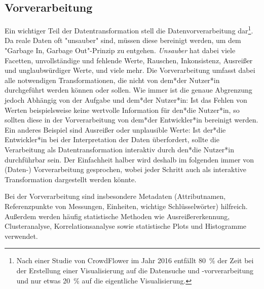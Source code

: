 	\subsection{Vorverarbeitung}
		Ein wichtiger Teil der Datentransformation stell die Datenvorverarbeitung dar\footnote{Nach einer Studie von CrowdFlower im Jahr 2016 entfällt \SI{80}{\percent} der Zeit bei der Erstellung einer Visualisierung auf die Datensuche und -vorverarbeitung und nur etwas \SI{20}{\percent} auf die eigentliche Visualisierung.}. Da reale Daten oft "unsauber" sind, müssen diese bereinigt werden, um dem "Garbage In, Garbage Out"-Prinzip zu entgehen. \emph{Unsauber} hat dabei viele Facetten, \zB unvollständige und fehlende Werte, Rauschen, Inkonsistenz, Ausreißer und unglaubwürdiger Werte, und viele mehr. Die Vorverarbeitung umfasst dabei alle notwendigen Transformationen, die nicht von dem*der Nutzer*in durchgeführt werden können oder sollen. Wie immer ist die genaue Abgrenzung jedoch Abhängig von der Aufgabe und dem*der Nutzer*in: Ist das Fehlen von Werten beispielsweise keine wertvolle Information für den*die Nutzer*in, so sollten diese in der Vorverarbeitung von dem*der Entwickler*in bereinigt werden. Ein anderes Beispiel sind Ausreißer oder unplausible Werte: Ist der*die Entwickler*in bei der Interpretation der Daten überfordert, sollte die Verarbeitung als Datentransformation interaktiv durch den*die Nutzer*in durchführbar sein. Der Einfachheit halber wird deshalb im folgenden immer von (Daten-) Vorverarbeitung gesprochen, wobei jeder Schritt auch als interaktive Transformation dargestellt werden könnte.

		Bei der Vorverarbeitung sind insbesondere Metadaten (\zB Attributnamen, Referenzpunkte von Messungen, Einheiten, wichtige Schlüsselwörter) hilfreich. Außerdem werden häufig statistische Methoden wie Ausreißererkennung, Clusteranalyse, Korrelationsanalyse sowie statistische Plots und Histogramme verwendet.

